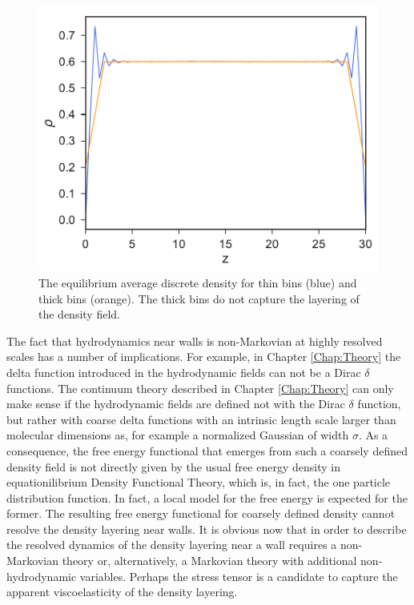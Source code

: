 \documentclass[b5paper,openright,10pt]{book}
\begin{document}
\begin{figure}[h!]
  \centering
\includegraphics[scale=0.41]{DensityProfile-WALLS}
\caption[Comparison between the fluid density profile for thin and thick bins]{The equilibrium average discrete density for thin bins (blue) and thick bins (orange). The thick bins do not capture the layering of the density field.}
\label{fig:DensityProfile-WALLS}
\end{figure}

The  fact that  hydrodynamics near  walls is  non-Markovian at  highly
resolved  scales  has a  number  of  implications. For example, in Chapter \ref{Chap:Theory} the delta function introduced in the hydrodynamic fields can not be a Dirac $\delta$ functions. 
The continuum theory  described in Chapter \ref{Chap:Theory} can  only make
sense if the hydrodynamic fields are  defined not with the Dirac $\delta$
function, but  rather with  coarse delta  functions with  an intrinsic
length  scale  larger than  molecular  dimensions  as, for  example  a
normalized Gaussian  of width  $\sigma$.  As  a consequence,  the free
energy functional  that emerges from  such a coarsely  defined density
field  is not  directly  given by  the usual  free  energy density  in
equationilibrium  Density Functional  Theory, which  is, in  fact, the  one
particle distribution function.  In fact,  a local model for the free energy 
is expected for  the former. The resulting free  energy functional for
coarsely  defined density  cannot  resolve the  density layering  near
walls.   It is  obvious now  that in  order to  describe the  resolved
dynamics of the density layering  near a wall requires a non-Markovian
theory  or,   alternatively,  a   Markovian  theory   with  additional
non-hydrodynamic variables.  Perhaps the  stress tensor is a candidate
to capture the apparent viscoelasticity of the density layering.
\end{document}
